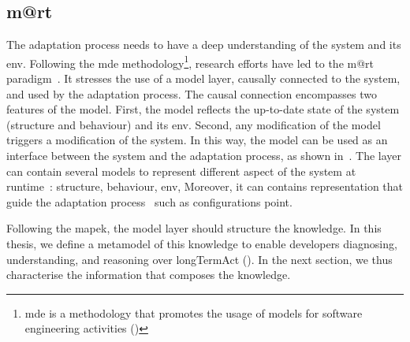 \subsection[Models@run.time]{\Gls{m@rt}}
\label{sec:background:sas:m@rt}
The adaptation process needs to have a deep understanding of the system and its \gls{env}.
Following the \gls{mde} methodology\footnote{\gls{mde} is a methodology that promotes the usage of \glspl{model} for software engineering activities (\cf {})}, research efforts have led to the \gls{m@rt} paradigm~\cite{DBLP:journals/computer/MorinBJFS09, DBLP:journals/computer/BlairBF09}.
It stresses the use of a model layer, causally connected to the system, and used by the adaptation process.
The causal connection encompasses two features of the \gls{model}.
First, the model reflects the up-to-date state of the system (structure and behaviour) and its \gls{env}.
Second, any modification of the model triggers a modification of the system.
In this way, the \gls{model} can be used as an interface between the system and the adaptation process, as shown in~.
The layer can contain several models to represent different aspect of the system at runtime~\cite{DBLP:journals/computer/MorinBJFS09}: structure, \gls{behaviour}, \gls{env}, \etc{}
Moreover, it can contains representation that guide the adaptation process~\cite{DBLP:journals/computer/CetinaGFP09, DBLP:journals/computer/HallsteinsenHPS08} such as configurations point.

Following the \gls{mapek}, the model layer should structure the knowledge.
In this thesis, we define a metamodel of this knowledge to enable developers diagnosing, understanding, and reasoning over \gls{longTermAct} (\cf {}).
In the next section, we thus characterise the information that composes the knowledge.


